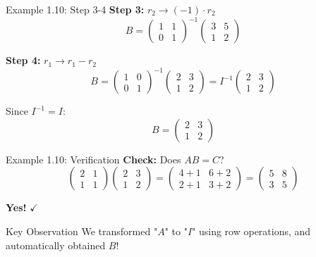 \documentclass[10pt]{beamer}
\theoremstyle{definition}
\begin{document}
\begin{frame}{Example 1.10: Step 3-4}
\textbf{Step 3:} $r_2 \to (-1) \cdot r_2$
$$B = \begin{pmatrix} 1 & 1 \\ 0 & 1 \end{pmatrix}^{-1} \begin{pmatrix} 3 & 5 \\ 1 & 2 \end{pmatrix}$$

\textbf{Step 4:} $r_1 \to r_1 - r_2$
$$B = \begin{pmatrix} 1 & 0 \\ 0 & 1 \end{pmatrix}^{-1} \begin{pmatrix} 2 & 3 \\ 1 & 2 \end{pmatrix} = I^{-1} \begin{pmatrix} 2 & 3 \\ 1 & 2 \end{pmatrix}$$

Since $I^{-1} = I$:
$$B = \begin{pmatrix} 2 & 3 \\ 1 & 2 \end{pmatrix}$$
\end{frame}

\begin{frame}{Example 1.10: Verification}
\textbf{Check:} Does $AB = C$?
$$\begin{pmatrix} 2 & 1 \\ 1 & 1 \end{pmatrix} \begin{pmatrix} 2 & 3 \\ 1 & 2 \end{pmatrix} = \begin{pmatrix} 4+1 & 6+2 \\ 2+1 & 3+2 \end{pmatrix} = \begin{pmatrix} 5 & 8 \\ 3 & 5 \end{pmatrix}$$

\begin{center}
\Large \textbf{Yes!} $\checkmark$
\end{center}

\vspace{0.3cm}
\begin{alertblock}{Key Observation}
We transformed "$A$" to "$I$" using row operations, and automatically obtained $B$!
\end{alertblock}
\end{frame}
\end{document}
